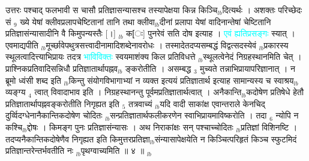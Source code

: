\documentclass[article,12pt,a4paper]{memoir}%
\newcommand{\quotelemma}[1]{\textcolor{cyan}{#1}}
\newcounter{parCount}
\begin{document}
	  
	  \pstart \leavevmode%
	उत्तरः पश्चाद् फलभावी स चासौ प्रतिज्ञासन्यासश्च तस्यापेक्षया किन्न किञ्चि{\tiny $_{lb}$}दित्यर्थः । अशक्तः परिच्छेदः सं {\tiny $_{9}$} \leavevmode{} ख्ये येषां क्लीवप्रलापचेष्टितानां तानि तथा क्लीवा{\tiny $_{lb}$}दीनां प्रलापा येषां वादिनान्तेषां चेष्टितानि प्रतिज्ञासंन्यासादीनि वै किमुपन्यस्तैः [।] {\tiny $_{lb}$} क[ः] पुनरेवं सति दोष इत्याह । \quotelemma{एवं ह्यतिप्रसङ्गः} \cite[11b6]{vn-msN} स्यात् । एवमाद्यपीति {\tiny $_{lb}$}मूर्च्छावेपथुत्रसत्त्वादीनामादिशब्देनावरोधः । तस्मादेतदप्यसम्बद्धं विद्वत्सदस्येवं {\tiny $_{lb}$}प्रकारस्य स्थूलत्वादित्त्याभिप्रायः तदत्र \quotelemma{भाविविक्तः} स्वयमाशंक्य किल प्रतिविधत्ते {\tiny $_{lb}$}स्थूलत्वेनेदं निग्रहस्थानमिति चेत् । प्राश्निकप्रतिवादिसन्निधौ प्रतिज्ञातार्थापह्नव{\tiny $_{lb}$}\leavevmode{} ङ्करोतीति । असम्बद्ध {\tiny $_{3}$} मुच्यते तन्नाभिप्रायापरिज्ञानात् । न ब्रूमो ध्वंसी शब्द इति {\tiny $_{lb}$}किन्तु संयोगविभागाभ्यां न व्यक्त इत्ययं प्रतिज्ञातार्थ इत्याह सामान्यस्य च स्वाश्रय{\tiny $_{lb}$}व्यङ्ग्य {\tiny $_{4}$} त्वात् विवादाभाव इति । निग्रहस्थानन्तु पूर्वमप्रतिज्ञातार्थत्वात् । अनैकान्ति{\tiny $_{lb}$}कदोषेण प्रतिषेधे हेतौ प्रतिज्ञातार्थापह्नवङ्करोतीति निगृह्यत इति {\tiny $_{5}$} तत्रवाच्यं {\tiny $_{lb}$}यदि वादी साकांक्ष एवान्तराले केनचिद् दुर्व्विदग्धेनानैकान्तिकदोषेण चोदितः {\tiny $_{lb}$}सन्प्रतिज्ञातार्थफलीकरणेन स्वाभिप्रायमाविष्करोति । तदा {\tiny $_{6}$} न्योपि न कश्चि{\tiny $_{lb}$}द्दोषः । किमङ्ग पुनः प्रतिज्ञासंन्यासः । अथ निराकांक्षः सन् पश्चाच्चोदितः {\tiny $_{lb}$}प्रतिज्ञां विशिनष्टि । तदप्यनैकान्तिकदोषेणैव निगृह्यत इति किमुत्तरप्रतिज्ञा{\tiny $_{lb}$}संन्यासापेक्षयेति न किञ्चित्परिहृतं किञ्च स्फुटमिदं प्रतिज्ञान्तरेन्तर्भवतीति नः {\tiny $_{lb}$}पृथग्वाच्यमिति ॥ ४ ॥
	{}
	\pend%
      {\tiny $_{lb}$}
\end{document}

